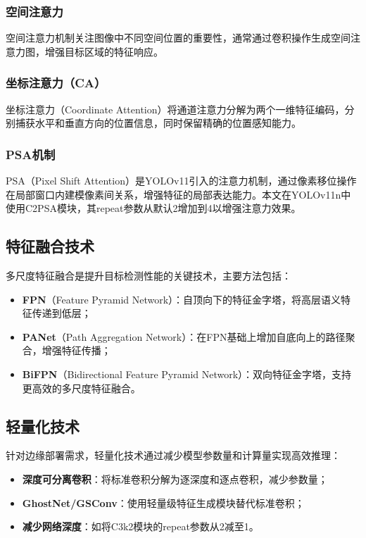 \documentclass[12pt,a4paper]{article}
\begin{document}
\subsubsection{空间注意力}
空间注意力机制关注图像中不同空间位置的重要性，通常通过卷积操作生成空间注意力图，增强目标区域的特征响应。

\subsubsection{坐标注意力（CA）}
坐标注意力（Coordinate Attention）将通道注意力分解为两个一维特征编码，分别捕获水平和垂直方向的位置信息，同时保留精确的位置感知能力。

\subsubsection{PSA机制}
PSA（Pixel Shift Attention）是YOLOv11引入的注意力机制，通过像素移位操作在局部窗口内建模像素间关系，增强特征的局部表达能力。本文在YOLOv11n中使用C2PSA模块，其repeat参数从默认2增加到4以增强注意力效果。

\subsection{特征融合技术}

多尺度特征融合是提升目标检测性能的关键技术，主要方法包括：

\begin{itemize}[noitemsep]
  \item \textbf{FPN}（Feature Pyramid Network）：自顶向下的特征金字塔，将高层语义特征传递到低层；
  \item \textbf{PANet}（Path Aggregation Network）：在FPN基础上增加自底向上的路径聚合，增强特征传播；
  \item \textbf{BiFPN}（Bidirectional Feature Pyramid Network）：双向特征金字塔，支持更高效的多尺度特征融合。
\end{itemize}

\subsection{轻量化技术}

针对边缘部署需求，轻量化技术通过减少模型参数量和计算量实现高效推理：
\begin{itemize}[noitemsep]
  \item \textbf{深度可分离卷积}：将标准卷积分解为逐深度和逐点卷积，减少参数量；
  \item \textbf{GhostNet/GSConv}：使用轻量级特征生成模块替代标准卷积；
  \item \textbf{减少网络深度}：如将C3k2模块的repeat参数从2减至1。
\end{itemize}
\end{document}
